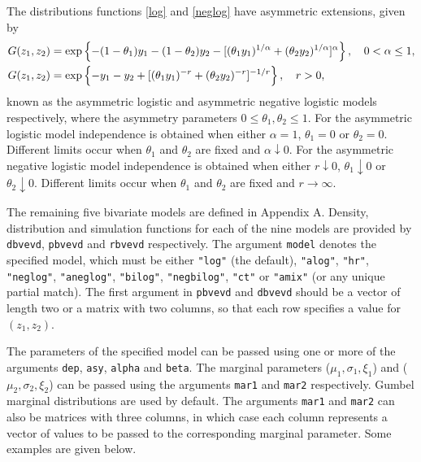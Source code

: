 \documentclass[11pt,a4paper]{article}
\begin{document}
The distributions functions \eqref{log} and \eqref{neglog} have asymmetric extensions, given by
\begin{align}
&G(z_1,z_2) = \exp\left\{ - (1-\theta_1)y_1 - (1-\theta_2)y_2 - [(\theta_1y_1)^{1/\alpha}+(\theta_2y_2)^{1/\alpha}]^\alpha\right\}, \quad 0<\alpha\leq1, \notag \\
&G(z_1,z_2) = \exp\left\{ - y_1 - y_2 + [(\theta_1y_1)^{-r}+(\theta_2y_2)^{-r}]^{-1/r}\right\}, \quad r>0, \notag 
\end{align}
known as the asymmetric logistic \citep{tawn88} and asymmetric negative logistic \citep{joe90} models respectively, where the asymmetry parameters $0\leq\theta_1,\theta_2\leq1$.
For the asymmetric logistic model independence is obtained when either $\alpha = 1$, $\theta_1 = 0$ or $\theta_2 = 0$.
Different limits occur when $\theta_1$ and $\theta_2$ are fixed and $\alpha\downarrow0$.
For the asymmetric negative logistic model independence is obtained when either $r\downarrow0$, $\theta_1\downarrow0$ or $\theta_2\downarrow0$. 
Different limits occur when $\theta_1$ and $\theta_2$ are fixed and $r\rightarrow\infty$.

The remaining five bivariate models are defined in Appendix A. Density, distribution and simulation functions for each of the nine models are provided by \verb+dbvevd+, \verb+pbvevd+ and \verb+rbvevd+ respectively.
The argument \verb+model+ denotes the specified model, which must be either \verb+"log"+ (the default), \verb+"alog"+, \verb+"hr"+, \verb+"neglog"+, \verb+"aneglog"+, \verb+"bilog"+, \verb+"negbilog"+, \verb+"ct"+ or \verb+"amix"+ (or any unique partial match).
The first argument in \verb+pbvevd+ and \verb+dbvevd+ should be a vector of length two or a matrix with two columns, so that each row specifies a value for $(z_1,z_2)$.

The parameters of the specified model can be passed using one or more of the arguments \verb+dep+, \verb+asy+, \verb+alpha+ and \verb+beta+.
The marginal parameters ($\mu_1,\sigma_1,\xi_1$) and ($\mu_2,\sigma_2,\xi_2$) can be passed using the arguments \verb+mar1+ and \verb+mar2+ respectively.
Gumbel marginal distributions are used by default.
The arguments \verb+mar1+ and \verb+mar2+ can also be matrices with three columns, in which case each column represents a vector of values to be passed to the corresponding marginal parameter.
Some examples are given below.
\end{document}
